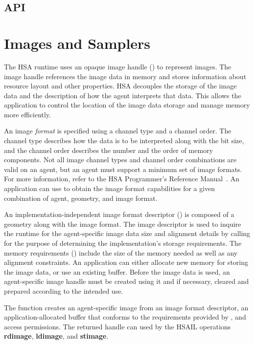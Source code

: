 \documentclass[final,oneside]{book}
\newcommand{\reffun}[1]{\textbf{#1}}
\newcommand{\refhsl}[1]{\reffun{#1}}
\begin{document}
\newpage
\subsection{API}


\newpage

\section{Images and Samplers}\label{sec:images}

The HSA runtime uses an opaque image handle () to
represent images. The image handle references the image data in memory and
stores information about resource layout and other properties. HSA decouples
the storage of the image data and the description of how the agent
interprets that data. This allows the application to control the location of the
image data storage and manage memory more efficiently.

An image \textit{format} is specified using a channel type and a channel
order. The channel type describes how the data is to be interpreted along with
the bit size, and the channel order describes the number and the order of memory
components. Not all image channel types and channel order combinations are valid
on an agent, but an agent must support a minimum set of image
formats. For more information, refer to the HSA Programmer's Reference
Manual~\cite{prm}. An application can use 
to obtain the image format capabilities for a given combination of agent,
geometry, and image format.

An implementation-independent image format descriptor
() is composed of a geometry along with the
image format. The image descriptor is used to inquire the runtime for the
agent-specific image data size and alignment details by calling
 for the purpose of determining the
implementation's storage requirements. The memory requirements
() include the size of the memory needed as
well as any alignment constraints. An application can either allocate new memory
for storing the image data, or use an existing buffer. Before the image data is
used, an agent-specific image handle must be created using it and if necessary,
cleared and prepared according to the intended use.

The function  creates an agent-specific image
from an image format descriptor, an application-allocated buffer that conforms
to the requirements provided by , and access
permissions. The returned handle can used by the HSAIL operations
\refhsl{rdimage}, \refhsl{ldimage}, and \refhsl{stimage}.
\end{document}
